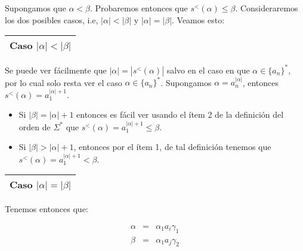     \par Supongamos que $\alpha < \beta$. Probaremos entonces que $s^{<}(\alpha) \leq \beta$.
    Consideraremos los dos posibles casos, i.e, $\left\vert \alpha \right\vert < \left\vert \beta \right\vert$ y
    $\left\vert \alpha \right\vert = \left\vert \beta \right\vert$. Veamos esto:

    \vspace{3mm}
    \begin{tabular}{|c|}
      \hline Caso $\left\vert \alpha \right\vert < \left\vert \beta \right\vert$\\\hline
    \end{tabular}

    \vspace{3mm}
    \par Se puede ver fácilmente que $\left\vert \alpha \right\vert = \left\vert s^{<}(\alpha) \right\vert$ salvo en el
    caso en que $\alpha \in \{a_{n}\}^{\ast}$, por lo cual solo resta ver el caso $\alpha \in \{a_{n}\}^{\ast}$.
    Supongamos $\alpha = a_{n}^{\left\vert \alpha \right\vert}$, entonces $s^{<}(\alpha) = a_{1}^{\left\vert \alpha
    \right\vert + 1}$.

    \begin{itemize}
      \item Si $\left\vert \beta \right\vert = \left\vert \alpha \right\vert + 1$ entonces es fácil ver
    usando el ítem 2 de la definición del orden de $\Sigma^{\ast}$ que $s^{<}(\alpha) = a_{1}^{\left\vert \alpha
    \right\vert + 1} \leq \beta$.
      \item Si $\left\vert \beta \right\vert > \left\vert \alpha \right\vert + 1$, entonces por
    el ítem 1, de tal definición tenemos que $s^{<}(\alpha) = a_{1}^{\left\vert \alpha \right\vert +1}< \beta$.
    \end{itemize}

    \vspace{5mm}
    \begin{tabular}{|c|}
      \hline Caso $\left\vert \alpha \right\vert =\left\vert \beta \right\vert$\\\hline
    \end{tabular}

    \vspace{3mm}
    \par Tenemos entonces que:

    \begin{eqnarray}
      \nonumber \alpha &=& \alpha_{1} a_{i} \gamma_{1} \\
      \nonumber \beta &=& \alpha_{1} a_{j} \gamma_{2}
    \end{eqnarray}

